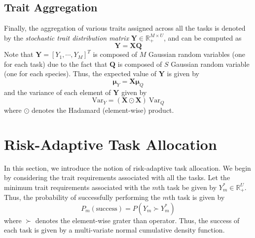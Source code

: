 \documentclass[letterpaper, 10 pt, conference]{ieeeconf}  %
\begin{document}
\subsection{Trait Aggregation}
Finally, the aggregation of various traits assigned across all the tasks is denoted by the \emph{stochastic trait distribution matrix} $\bm{Y} \in \mathbb{R}_{+}^{M \times U}$, and can be computed as
\begin{equation}
    \bm{Y} = \bm{X}\bm{Q}
\end{equation}
Note that $\bm{Y}=[Y_1,\cdots,Y_M]^T$ is composed of $M$ Gaussian random variables (one for each task) due to the fact that $\bm{Q}$ is composed of $S$ Gaussian random variable (one for each species). Thus, the expected value of $\bm{Y}$ is given by
\begin{equation}
    \bm{\mu}_Y =  \bm{X} \bm{\mu}_Q \label{eq:mean_trait_dist_tasks}
\end{equation}
and the variance of each element of $\bm{Y}$ given by
\begin{equation}
    \bm{\mathrm{Var}}_{Y} = (\bm{X} \odot \bm{X})\ \bm{\mathrm{Var}}_Q \label{eq:var_trait_dist_tasks}
\end{equation}
where $\odot$ denotes the Hadamard (element-wise) product. 

\section{Risk-Adaptive Task Allocation}

In this section, we introduce the notion of risk-adaptive task allocation. We begin by considering the trait requirements associated with all the tasks. Let the minimum trait requirements associated with the $m$th task be given by $Y_m^*\in \mathbb{R}_+^{U}$. Thus, the probability of successfully performing the $m$th task is given by 
\begin{equation}
    P_m(\text{success}) = P(Y_m \succ Y^*_m) \label{eq:success_prob}
\end{equation}
where $\succ$ denotes the element-wise grater than operator. Thus, the success of each task is given by a multi-variate normal cumulative density function.
\end{document}
